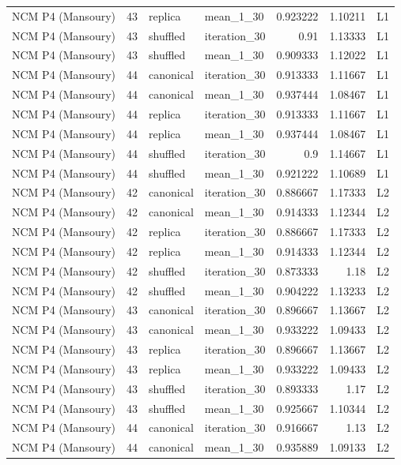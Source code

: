 \begin{table}[htbp!]
\begin{tabular}{lrllrrl}
NCM P4 (Mansoury) & 43 & replica & mean\_1\_30 & 0.923222 & 1.10211 & L1 \\
NCM P4 (Mansoury) & 43 & shuffled & iteration\_30 & 0.91 & 1.13333 & L1 \\
NCM P4 (Mansoury) & 43 & shuffled & mean\_1\_30 & 0.909333 & 1.12022 & L1 \\
NCM P4 (Mansoury) & 44 & canonical & iteration\_30 & 0.913333 & 1.11667 & L1 \\
NCM P4 (Mansoury) & 44 & canonical & mean\_1\_30 & 0.937444 & 1.08467 & L1 \\
NCM P4 (Mansoury) & 44 & replica & iteration\_30 & 0.913333 & 1.11667 & L1 \\
NCM P4 (Mansoury) & 44 & replica & mean\_1\_30 & 0.937444 & 1.08467 & L1 \\
NCM P4 (Mansoury) & 44 & shuffled & iteration\_30 & 0.9 & 1.14667 & L1 \\
NCM P4 (Mansoury) & 44 & shuffled & mean\_1\_30 & 0.921222 & 1.10689 & L1 \\
NCM P4 (Mansoury) & 42 & canonical & iteration\_30 & 0.886667 & 1.17333 & L2 \\
NCM P4 (Mansoury) & 42 & canonical & mean\_1\_30 & 0.914333 & 1.12344 & L2 \\
NCM P4 (Mansoury) & 42 & replica & iteration\_30 & 0.886667 & 1.17333 & L2 \\
NCM P4 (Mansoury) & 42 & replica & mean\_1\_30 & 0.914333 & 1.12344 & L2 \\
NCM P4 (Mansoury) & 42 & shuffled & iteration\_30 & 0.873333 & 1.18 & L2 \\
NCM P4 (Mansoury) & 42 & shuffled & mean\_1\_30 & 0.904222 & 1.13233 & L2 \\
NCM P4 (Mansoury) & 43 & canonical & iteration\_30 & 0.896667 & 1.13667 & L2 \\
NCM P4 (Mansoury) & 43 & canonical & mean\_1\_30 & 0.933222 & 1.09433 & L2 \\
NCM P4 (Mansoury) & 43 & replica & iteration\_30 & 0.896667 & 1.13667 & L2 \\
NCM P4 (Mansoury) & 43 & replica & mean\_1\_30 & 0.933222 & 1.09433 & L2 \\
NCM P4 (Mansoury) & 43 & shuffled & iteration\_30 & 0.893333 & 1.17 & L2 \\
NCM P4 (Mansoury) & 43 & shuffled & mean\_1\_30 & 0.925667 & 1.10344 & L2 \\
NCM P4 (Mansoury) & 44 & canonical & iteration\_30 & 0.916667 & 1.13 & L2 \\
NCM P4 (Mansoury) & 44 & canonical & mean\_1\_30 & 0.935889 & 1.09133 & L2 \\

\end{tabular}
\end{table}
